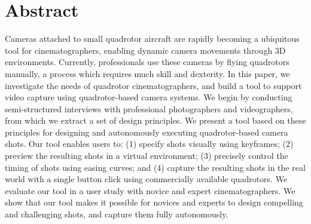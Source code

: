 


\section{Abstract}

Cameras attached to small quadrotor aircraft are rapidly becoming a ubiquitous tool for cinematographers, enabling dynamic camera movements through 3D environments.
Currently, professionals use these cameras by flying quadrotors manually, a process which requires much skill and dexterity. 
In this paper, we investigate the needs of quadrotor cinematographers, and build a tool to support video capture using quadrotor-based camera systems.
We begin by conducting semi-structured interviews with professional photographers and videographers, from which we extract a set of design principles.
We present a tool based on these principles for designing and autonomously executing quadrotor-based camera shots.
Our tool enables users to: (1) specify shots visually using keyframes; (2) preview the resulting shots in a virtual environment; (3) precisely control the timing of shots using easing curves; and (4) capture the resulting shots in the real world with a single button click using commercially available quadrotors.
We evaluate our tool in a user study with novice and expert cinematographers.
We show that our tool makes it possible for novices and experts to design compelling and challenging shots, and capture them fully autonomously.
